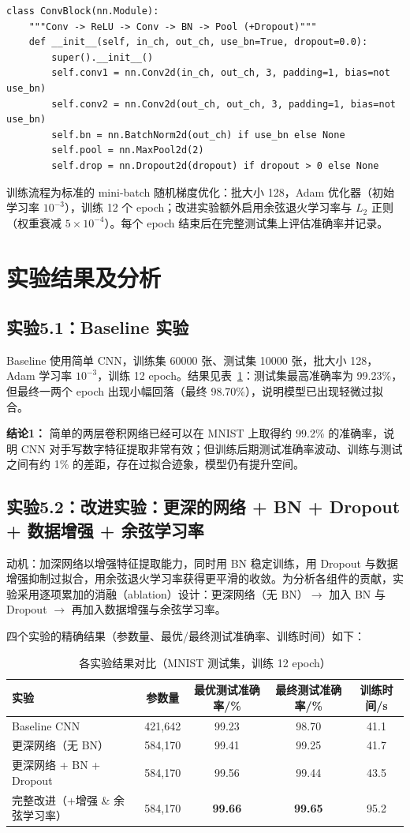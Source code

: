 \documentclass[UTF8,zihao=-4]{ctexart}
\newcommand{\mlExperiment}[2]{\subsection{实验#1：#2}}
\newcommand{\mlConclusion}[1]{\par\noindent\textbf{结论#1：}}
\begin{document}
\begin{lstlisting}
class ConvBlock(nn.Module):
    """Conv -> ReLU -> Conv -> BN -> Pool (+Dropout)"""
    def __init__(self, in_ch, out_ch, use_bn=True, dropout=0.0):
        super().__init__()
        self.conv1 = nn.Conv2d(in_ch, out_ch, 3, padding=1, bias=not use_bn)
        self.conv2 = nn.Conv2d(out_ch, out_ch, 3, padding=1, bias=not use_bn)
        self.bn = nn.BatchNorm2d(out_ch) if use_bn else None
        self.pool = nn.MaxPool2d(2)
        self.drop = nn.Dropout2d(dropout) if dropout > 0 else None
\end{lstlisting}

训练流程为标准的 mini-batch 随机梯度优化：批大小 128，Adam 优化器（初始学习率 $10^{-3}$），训练 12 个 epoch；改进实验额外启用余弦退火学习率与 $L_2$ 正则（权重衰减 $5\times 10^{-4}$）。每个 epoch 结束后在完整测试集上评估准确率并记录。

\section{实验结果及分析}

\mlExperiment{5.1}{Baseline 实验}
Baseline 使用简单 CNN，训练集 60000 张、测试集 10000 张，批大小 128，Adam 学习率 $10^{-3}$，训练 12 epoch。结果见表~\ref{tab:result}：测试集最高准确率为 99.23\%，但最终一两个 epoch 出现小幅回落（最终 98.70\%），说明模型已出现轻微过拟合。

\mlConclusion{1}
简单的两层卷积网络已经可以在 MNIST 上取得约 99.2\% 的准确率，说明 CNN 对手写数字特征提取非常有效；但训练后期测试准确率波动、训练与测试之间有约 1\% 的差距，存在过拟合迹象，模型仍有提升空间。

\mlExperiment{5.2}{改进实验：更深的网络 + BN + Dropout + 数据增强 + 余弦学习率}
动机：加深网络以增强特征提取能力，同时用 BN 稳定训练，用 Dropout 与数据增强抑制过拟合，用余弦退火学习率获得更平滑的收敛。为分析各组件的贡献，实验采用逐项累加的消融（ablation）设计：更深网络（无 BN）$\to$ 加入 BN 与 Dropout $\to$ 再加入数据增强与余弦学习率。

四个实验的精确结果（参数量、最优/最终测试准确率、训练时间）如下：

\begin{table}[H]
  \centering
  \caption{各实验结果对比（MNIST 测试集，训练 12 epoch）}
  \label{tab:result}
  \begin{tabular}{lcccc}
    \toprule
    实验 & 参数量 & 最优测试准确率/\% & 最终测试准确率/\% & 训练时间/s \\
    \midrule
    Baseline CNN & 421,642 & 99.23 & 98.70 & 41.1 \\
    更深网络（无 BN） & 584,170 & 99.41 & 99.25 & 41.7 \\
    更深网络 + BN + Dropout & 584,170 & 99.56 & 99.44 & 43.5 \\
    完整改进（+增强 \& 余弦学习率） & 584,170 & \textbf{99.66} & \textbf{99.65} & 95.2 \\
    \bottomrule
  \end{tabular}
\end{table}
\end{document}
